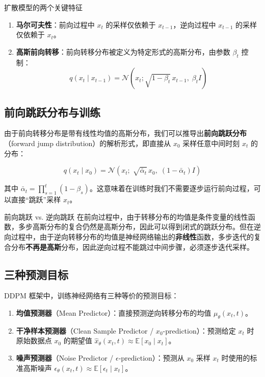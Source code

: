 \documentclass[a4paper]{article}
\begin{document}
\begin{importantbox}{扩散模型的两个关键特征}
\begin{enumerate}
    \item \textbf{马尔可夫性}：前向过程中 $x_t$ 的采样仅依赖于 $x_{t-1}$，逆向过程中 $x_{t-1}$ 的采样仅依赖于 $x_t$。
    \item \textbf{高斯前向转移}：前向转移分布被定义为特定形式的高斯分布，由参数 $\beta_t$ 控制：
    $$q(x_t \mid x_{t-1}) = \mathcal{N}(x_t; \sqrt{1-\beta_t}\, x_{t-1},\; \beta_t I)$$
\end{enumerate}
\end{importantbox}

\subsection{前向跳跃分布与训练}

由于前向转移分布是带有线性均值的高斯分布，我们可以推导出\textbf{前向跳跃分布}（forward jump distribution）的解析形式，即直接从 $x_0$ 采样任意中间时刻 $x_t$ 的分布：

$$q(x_t \mid x_0) = \mathcal{N}(x_t;\; \sqrt{\bar{\alpha}_t}\, x_0,\; (1-\bar{\alpha}_t) I)$$

其中 $\bar{\alpha}_t = \prod_{s=1}^{t}(1-\beta_s)$。这意味着在训练时我们不需要逐步运行前向过程，可以直接``跳跃''采样 $x_t$。

\begin{knowledgebox}{前向跳跃 vs. 逆向跳跃}
在前向过程中，由于转移分布的均值是条件变量的线性函数，多步高斯分布的复合仍然是高斯分布，因此可以得到闭式的跳跃分布。但在逆向过程中，由于逆向转移分布的均值是神经网络输出的\textbf{非线性}函数，多步迭代的复合分布\textbf{不再是高斯}分布，因此逆向过程不能跳过中间步骤，必须逐步迭代采样。
\end{knowledgebox}

\subsection{三种预测目标}

DDPM 框架中，训练神经网络有三种等价的预测目标：

\begin{enumerate}
    \item \textbf{均值预测器}（Mean Predictor）：直接预测逆向转移分布的均值 $\mu_\theta(x_t, t)$。
    \item \textbf{干净样本预测器}（Clean Sample Predictor / $x_0$-prediction）：预测给定 $x_t$ 时原始数据点 $x_0$ 的期望值 $\hat{x}_\theta(x_t, t) \approx \mathbb{E}[x_0 \mid x_t]$。
    \item \textbf{噪声预测器}（Noise Predictor / $\epsilon$-prediction）：预测从 $x_0$ 采样 $x_t$ 时使用的标准高斯噪声 $\epsilon_\theta(x_t, t) \approx \mathbb{E}[\epsilon_t \mid x_t]$。
\end{enumerate}
\end{document}

